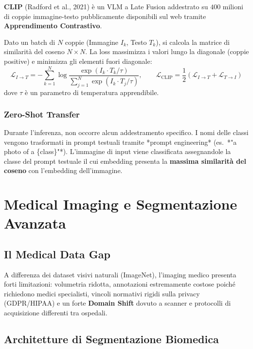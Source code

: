 \documentclass[12pt, a4paper]{report}
\begin{document}
\textbf{CLIP} (Radford et al., 2021) è un VLM a Late Fusion addestrato su $400$ milioni di
coppie immagine-testo pubblicamente disponibili sul web tramite \textbf{Apprendimento Contrastivo}.

\begin{defbox}
Dato un batch di $N$ coppie (Immagine $I_k$, Testo $T_k$), si calcola la matrice di
similarità del coseno $N \times N$. La loss massimizza i valori lungo la diagonale
(coppie positive) e minimizza gli elementi fuori diagonale:
\[
  \mathcal{L}_{I \to T} = -\sum_{k=1}^N \log \frac{\exp(I_k \cdot T_k / \tau)}{\sum_{j=1}^N \exp(I_k \cdot T_j / \tau)}, \qquad
  \mathcal{L}_{\text{CLIP}} = \frac{1}{2}\left(\mathcal{L}_{I \to T} + \mathcal{L}_{T \to I}\right)
\]
dove $\tau$ è un parametro di temperatura apprendibile.
\end{defbox}

\subsection{Zero-Shot Transfer}

Durante l'inferenza, non occorre alcun addestramento specifico. I nomi delle classi
vengono trasformati in prompt testuali tramite *prompt engineering* (es.\ *"a photo of a \{class\}"*).
L'immagine di input viene classificata assegnandole la classe del prompt testuale il cui
embedding presenta la \textbf{massima similarità del coseno} con l'embedding dell'immagine.

\chapter{Medical Imaging e Segmentazione Avanzata}

\section{Il Medical Data Gap}

A differenza dei dataset visivi naturali (ImageNet), l'imaging medico presenta forti
limitazioni: volumetria ridotta, annotazioni estremamente costose poiché richiedono
medici specialisti, vincoli normativi rigidi sulla privacy (GDPR/HIPAA) e un forte
\textbf{Domain Shift} dovuto a scanner e protocolli di acquisizione differenti tra ospedali.

\section{Architetture di Segmentazione Biomedica}
\end{document}
